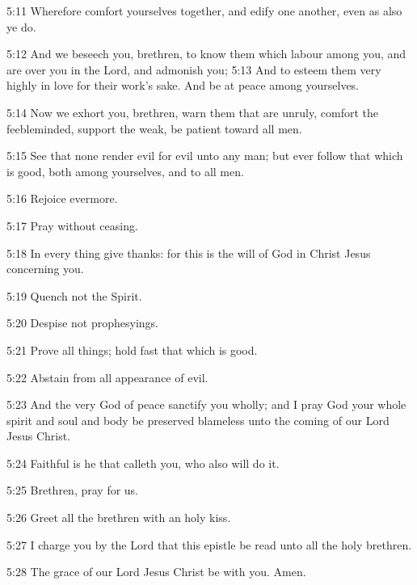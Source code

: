 5:11 Wherefore comfort yourselves together, and edify one another, even as also ye do.

5:12 And we beseech you, brethren, to know them which labour among you, and are over you in the Lord, and admonish you; 5:13 And to esteem them very highly in love for their work's sake. And be at peace among yourselves.

5:14 Now we exhort you, brethren, warn them that are unruly, comfort the feebleminded, support the weak, be patient toward all men.

5:15 See that none render evil for evil unto any man; but ever follow that which is good, both among yourselves, and to all men.

5:16 Rejoice evermore.

5:17 Pray without ceasing.

5:18 In every thing give thanks: for this is the will of God in Christ Jesus concerning you.

5:19 Quench not the Spirit.

5:20 Despise not prophesyings.

5:21 Prove all things; hold fast that which is good.

5:22 Abstain from all appearance of evil.

5:23 And the very God of peace sanctify you wholly; and I pray God your whole spirit and soul and body be preserved blameless unto the coming of our Lord Jesus Christ.

5:24 Faithful is he that calleth you, who also will do it.

5:25 Brethren, pray for us.

5:26 Greet all the brethren with an holy kiss.

5:27 I charge you by the Lord that this epistle be read unto all the holy brethren.

5:28 The grace of our Lord Jesus Christ be with you. Amen.

